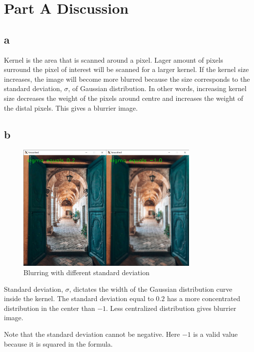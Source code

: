 \section{Part A Discussion}

\subsection{a}
Kernel is the area that is scanned around a pixel. Lager amount of pixels surround the pixel of interest will be scanned for a larger kernel. If the kernel size increases, the image will become more blurred because the size corresponds to the standard deviation, $\sigma$, of Gaussian distribution. In other words, increasing kernel size decreases the weight of the pixels around centre and increases the weight of the distal pixels. This gives a blurrier image.



\subsection{b}
\begin{figure}[htbp]
   \centering
   \includegraphics[width=0.8\textwidth]{assets/images/figures/std_dev.png}
   \caption{Blurring with different standard deviation}
   \label{fig:std_dev}
\end{figure}

Standard deviation, $\sigma$, dictates the width of the Gaussian distribution curve inside the kernel. The standard deviation equal to $0.2$ has a more concentrated distribution in the center than $-1$. Less centralized distribution gives blurrier image.

Note that the standard deviation cannot be negative. Here $-1$ is a valid value because it is squared in the formula.

